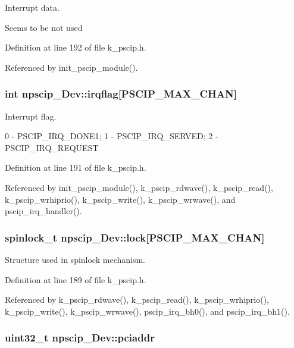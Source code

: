 Interrupt data. 

Seems to be not used 

Definition at line 192 of file k\_\-pscip.h.

Referenced by init\_\-pscip\_\-module().\hypertarget{structnpscip___dev_267da34d5acdd2acaf2af946707736f1}{
\subsubsection[{irqflag}]{\setlength{\rightskip}{0pt plus 5cm}int {\bf npscip\_\-Dev::irqflag}\mbox{[}PSCIP\_\-MAX\_\-CHAN\mbox{]}}}
\label{structnpscip___dev_267da34d5acdd2acaf2af946707736f1}


Interrupt flag. 

0 - PSCIP\_\-IRQ\_\-DONE1; 1 - PSCIP\_\-IRQ\_\-SERVED; 2 - PSCIP\_\-IRQ\_\-REQUEST 

Definition at line 191 of file k\_\-pscip.h.

Referenced by init\_\-pscip\_\-module(), k\_\-pscip\_\-rdwave(), k\_\-pscip\_\-read(), k\_\-pscip\_\-wrhiprio(), k\_\-pscip\_\-write(), k\_\-pscip\_\-wrwave(), and pscip\_\-irq\_\-handler().\hypertarget{structnpscip___dev_fd76f4660b40aff8b4ff34ab3c254d35}{
\subsubsection[{lock}]{\setlength{\rightskip}{0pt plus 5cm}spinlock\_\-t {\bf npscip\_\-Dev::lock}\mbox{[}PSCIP\_\-MAX\_\-CHAN\mbox{]}}}
\label{structnpscip___dev_fd76f4660b40aff8b4ff34ab3c254d35}


Structure used in spinlock mechanism. 



Definition at line 189 of file k\_\-pscip.h.

Referenced by k\_\-pscip\_\-rdwave(), k\_\-pscip\_\-read(), k\_\-pscip\_\-wrhiprio(), k\_\-pscip\_\-write(), k\_\-pscip\_\-wrwave(), pscip\_\-irq\_\-bh0(), and pscip\_\-irq\_\-bh1().\hypertarget{structnpscip___dev_3cfba26d2b0e3fa6a0544e3d262065d2}{
\subsubsection[{pciaddr}]{\setlength{\rightskip}{0pt plus 5cm}uint32\_\-t {\bf npscip\_\-Dev::pciaddr}}}
\label{structnpscip___dev_3cfba26d2b0e3fa6a0544e3d262065d2}


